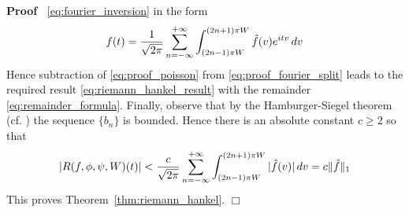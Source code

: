 \documentclass{article}
\newenvironment{proof}{\noindent\textbf{Proof\ }}{\hspace*{\fill}$\Box$\medskip}
\begin{document}
\begin{proof}
  \eqref{eq:fourier_inversion} in the form
  \begin{equation}
    f (t) = \frac{1}{\sqrt{2 \pi}}  \sum_{n = - \infty}^{+ \infty} \int_{(2 n
    - 1) \pi W}^{(2 n + 1) \pi W} \hat{f} (v) e^{itv}  \hspace{0.17em} dv
    \label{eq:proof_fourier_split}
  \end{equation}
  Hence subtraction of \eqref{eq:proof_poisson} from
  \eqref{eq:proof_fourier_split} leads to the required result
  \eqref{eq:riemann_hankel_result} with the remainder
  \eqref{eq:remainder_formula}. Finally, observe that by the Hamburger-Siegel
  theorem (cf. {\cite{19,29,30}}) the sequence $\{b_n \}$ is bounded. Hence
  there is an absolute constant $c \geq 2$ so that
  \begin{equation}
    |R (f, \phi, \psi, W) (t) | < \frac{c}{\sqrt{2 \pi}}  \sum_{n = -
    \infty}^{+ \infty} \int_{(2 n - 1) \pi W}^{(2 n + 1) \pi W} | \hat{f} (v)
    |  \hspace{0.17em} dv = c \| \hat{f} \|_1 \label{eq:remainder_bound}
  \end{equation}
  This proves Theorem~\ref{thm:riemann_hankel}.
\end{proof}
\end{document}
